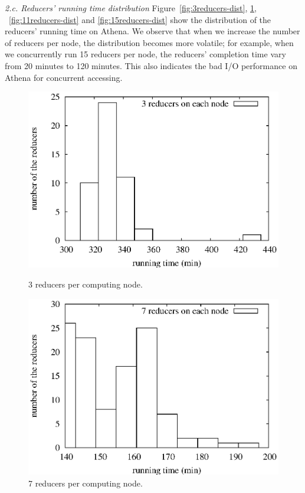 \smallskip
\textit{2.c. Reducers' running time distribution}
Figure~\ref{fig:3reducers-dist}, \ref{fig:7reducers-dist},
~\ref{fig:11reducers-dist} and \ref{fig:15reducers-dist} show the
distribution of the reducers' running time on Athena. We observe that when we
increase the number of reducers per node, the distribution becomes more
volatile; for example, when we concurrently run 15 reducers per node, the reducers'
completion time vary from 20 minutes to 120 minutes. This also indicates the
bad I/O performance on Athena for concurrent accessing.

\begin{figure}[htbp]
\hfill
\begin{minipage}[t]{0.45\linewidth}
\begin{center}
\centerline{\includegraphics[scale=0.33]{plots/miami-3reducers-dist.eps}}
\caption{3 reducers per computing node.}
\label{fig:3reducers-dist}
\end{center}
\end{minipage}
\hfill
\begin{minipage}[t]{0.45\linewidth}
\begin{center}
\centerline{\includegraphics[scale=0.33]{plots/miami-7reducers-dist.eps}}
\caption{7 reducers per computing node.}
\label{fig:7reducers-dist}
\end{center}
\end{minipage}
\hfill
\end{figure}

